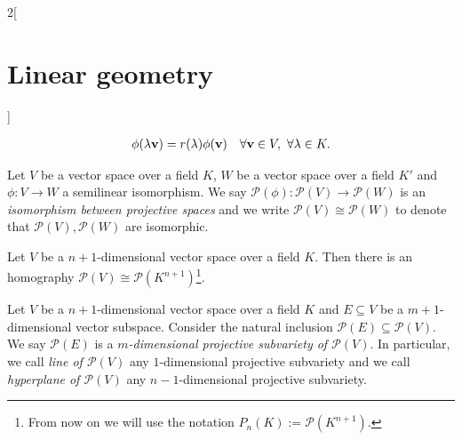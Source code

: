 \documentclass[../../../main.tex]{subfiles}
\begin{document}
\begin{multicols}{2}[\section{Linear geometry}]
\begin{definition}
\begin{gather*}
            \phi(\lambda \vb{v})=r(\lambda)\phi(\vb{v})\quad \forall \vb{v}\in V,\ \forall\lambda\in K.
        \end{gather*}
    \end{definition}
    \begin{definition}
        Let $V$ be a vector space over a field $K$, $W$ be a vector space over a field $K'$ and $\phi:V\rightarrow W$ a semilinear isomorphism. We say $\mathcal{P}(\phi):\mathcal{P}(V)\rightarrow\mathcal{P}(W)$ is an \textit{isomorphism between projective spaces} and we write $\mathcal{P}(V)\cong \mathcal{P}(W)$ to denote that $\mathcal{P}(V),\mathcal{P}(W)$ are isomorphic.
    \end{definition}
    \begin{prop}
        Let $V$ be a $n+1$-dimensional vector space over a field $K$. Then there is an homography $\mathcal{P}(V)\cong \mathcal{P}(K^{n+1})$\footnote{From now on we will use the notation $P_n(K):=\mathcal{P}(K^{n+1})$.}.
    \end{prop}
    \begin{definition}
        Let $V$ be a $n+1$-dimensional vector space over a field $K$ and $E\subseteq V$ be a $m+1$-dimensional vector subspace. Consider the natural inclusion $\mathcal{P}(E)\subseteq\mathcal{P}(V)$. We say $\mathcal{P}(E)$ is a \textit{$m$-dimensional projective subvariety of $\mathcal{P}(V)$}. In particular, we call \textit{line of $\mathcal{P}(V)$} any $1$-dimensional projective subvariety and we call \textit{hyperplane of $\mathcal{P}(V)$} any $n-1$-dimensional projective subvariety.
    \end{definition}

\end{multicols}
\end{document}
